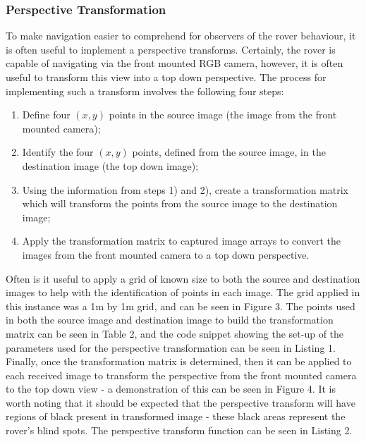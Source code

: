 \documentclass[a4paper]{article}
\begin{document}
\subsubsection{Perspective Transformation}
To make navigation easier to comprehend for observers of the rover behaviour, it is often useful to implement a perspective transforms. Certainly, the rover is capable of navigating via the front mounted RGB camera, however, it is often useful to transform this view into a top down perspective. The process for implementing such a transform involves the following four steps:
\begin{enumerate}
\item Define four $(x,y)$ points in the source image (the image from the front mounted camera);
\item Identify the four $(x,y)$ points, defined from the source image, in the destination image (the top down image);
\item Using the information from steps 1) and 2), create a transformation matrix which will transform the points from the source image to the destination image;
\item Apply the transformation matrix to captured image arrays to convert the images from the front mounted camera to a top down perspective.
\end{enumerate}  

Often is it useful to apply a grid of known size to both the source and destination images to help with the identification of points in each image. The grid applied in this instance was a 1$\si{\meter}$ by 1$\si{\meter}$ grid, and can be seen in Figure 3. The points used in both the source image and destination image to build the transformation matrix can be seen in Table 2, and the code snippet showing the set-up of the parameters used for the perspective transformation can be seen in Listing 1. Finally, once the transformation matrix is determined, then it can be applied to each received image to transform the perspective from the front mounted camera to the top down view - a demonstration of this can be seen in Figure 4. It is worth noting that it should be expected that the perspective transform will have regions of black present in transformed image - these black areas represent the rover's blind spots. The perspective transform function can be seen in Listing 2.
\end{document}
